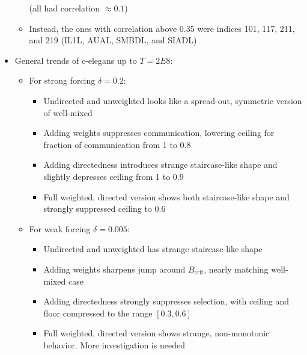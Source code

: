 \documentclass[openacc]{class/rsprocb_new}
\begin{document}
\begin{itemize}
\begin{itemize}
      (all had correlation $\approx \num{0.1}$)
    \item Instead, the ones with correlation above \num{0.35} were
      indices 101, 117, 211, and 219 (IL1L, AUAL, SMBDL, and SIADL)
  \end{itemize}
  \item General trends of c-elegans up to $T = 2E8$:
  \begin{itemize}
    \item For strong forcing $\delta = 0.2$:
    \begin{itemize}
      \item Undirected and unweighted looks like a spread-out, symmetric
        version of well-mixed
      \item Adding weights suppresses communication, lowering ceiling
        for fraction of communication from \num{1} to \num{0.8}
      \item Adding directedness introduces strange staircase-like shape
        and slightly depresses ceiling from \num{1} to \num{0.9}
      \item Full weighted, directed version shows both staircase-like
        shape and strongly suppressed ceiling to \num{0.6}
    \end{itemize}
    \item For weak forcing $\delta = 0.005$:
    \begin{itemize}
      \item Undirected and unweighted has strange staircase-like shape
      \item Adding weights sharpens jump around $B_\text{crit}$, nearly
        matching well-mixed case
      \item Adding directedness strongly suppresses selection, with
        ceiling and floor compressed to the range $[0.3,0.6]$
      \item Full weighted, directed version shows strange, non-monotonic
        behavior. More investigation is needed
    \end{itemize}
  \end{itemize}
\end{itemize}




\end{document}
